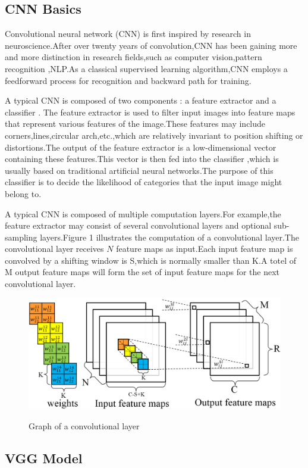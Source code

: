 \documentclass[conference]{IEEEtran}
\begin{document}
\subsection{CNN Basics}
Convolutional neural network (CNN) is first inspired by research in 
neuroscience.After over twenty years of convolution,CNN has been gaining 
more and more distinction in research fields,such as computer vision,pattern
recognition ,NLP.As a classical supervised learning algorithm,CNN employs 
a feedforward process for recognition and backward path for training.


A typical CNN is composed of two components : a feature extractor and a classifier . The feature extractor is used to filter input images into 
feature maps that represent various features of the image.These features may 
include corners,lines,circular arch,etc.,which are relatively invariant to
position shifting or distortions.The output of the feature extractor is a low-dimensional vector containing these features.This vector is then fed into the classifier ,which is usually based on traditional artificial neural 
networks.The purpose of this classifier is to decide the likelihood of 
categories that the input image might belong to.

A typical CNN is composed of multiple computation layers.For example,the feature extractor may consist of several convolutional layers and 
optional sub-sampling layers.Figure 1 illustrates the computation of a convolutional layer.The convolutional layer receives $N$ feature maps as input.Each input feature map is convolved by a shifting window is S,which 
is normally smaller than K.A totel of M output feature maps will form the 
set of input feature maps for the next convolutional layer.  

\begin{figure}[h]
	\centering
	{\includegraphics[width=0.8\linewidth]{convolve.png}}
	\caption{Graph of a convolutional layer}
\end{figure}
\subsection{VGG Model}
\end{document}
